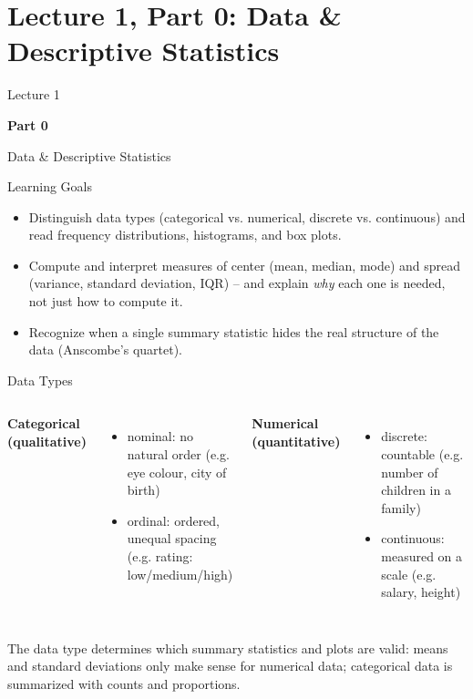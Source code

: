 \section{Lecture 1, Part 0: Data \& Descriptive Statistics}

\begin{frame}
\vfill
\centering
{\color{RLBlue}\large Lecture 1}

\vspace{0.3em}
{\color{RLBlue}\Large\bfseries Part 0}

\vspace{0.6em}
{\Large Data \& Descriptive Statistics}
\vfill
\end{frame}

\begin{frame}{Learning Goals}
\begin{itemize}
  \item Distinguish data types (categorical vs. numerical, discrete vs. continuous) and read frequency distributions, histograms, and box plots.
  \pause
  \item Compute and interpret measures of center (mean, median, mode) and spread (variance, standard deviation, IQR) -- and explain \emph{why} each one is needed, not just how to compute it.
  \pause
  \item Recognize when a single summary statistic hides the real structure of the data (Anscombe's quartet).
\end{itemize}
\end{frame}

\begin{frame}{Data Types}
\begin{columns}[T]
\textbf{Categorical (qualitative)}
\begin{itemize}
  \item nominal: no natural order (e.g. eye colour, city of birth)
  \pause
  \item ordinal: ordered, unequal spacing (e.g. rating: low/medium/high)
\end{itemize}

\pause
{}
\textbf{Numerical (quantitative)}
\begin{itemize}
  \item discrete: countable (e.g. number of children in a family)
  \pause
  \item continuous: measured on a scale (e.g. salary, height)
\end{itemize}
\end{columns}

\pause
\begin{rlintuition}
The data type determines which summary statistics and plots are valid: means and standard deviations only make sense for numerical data; categorical data is summarized with counts and proportions.
\end{rlintuition}
\end{frame}

